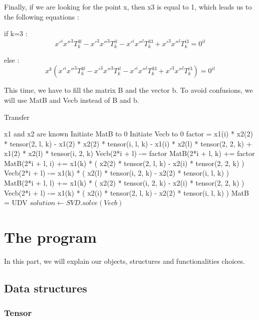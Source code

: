 \documentclass[a4paper,10pt]{report}
\begin{document}
Finally, if we are looking for the point x, then x3 is equal to 1, which leads us to the following equations :

if k=3 :
\[x'^{i}x''^{3}T^{3l}_{k} - x'^{3}x''^{3}T^{il}_{k} - x'^{i}x''^{l}T^{33}_{k} + x'^{3}x''^{l}T^{i3}_{k} = 0^{il}\]

else :
\[x^{k}(x'^{i}x''^{3}T^{3l}_{k} - x'^{3}x''^{3}T^{il}_{k} - x'^{i}x''^{l}T^{33}_{k} + x'^{3}x''^{l}T^{i3}_{k}) = 0^{il}\]

This time, we have to fill the matrix B and the vector b. To avoid confusions, we will use MatB and Vecb instead of B and b.

\begin{algorithm}
\caption{Transfer}
\begin{algorithmic}
\REQUIRE x1 and x2 are known
\STATE Initiate MatB to 0
\STATE Initiate Vecb to 0
\STATE factor = x1(i) * x2(2) * tensor(2, l, k) - x1(2) * x2(2) * tensor(i, l, k) - x1(i) * x2(l) * tensor(2, 2, k) + x1(2) * x2(l) * tensor(i, 2, k)
\STATE Vecb(2*i + l) -= factor
\ELSE
\STATE MatB(2*i + l, k) += factor
\ENDIF
{}
\STATE MatB(2*i + l, i) += x1(k) * ( x2(2) * tensor(2, l, k) - x2(i) * tensor(2, 2, k) )
\STATE Vecb(2*i + l) -= x1(k) * ( x2(l) * tensor(i, 2, k) - x2(2) * tensor(i, l, k) )
\STATE MatB(2*i + l, l) += x1(k) * ( x2(2) * tensor(i, 2, k) - x2(i) * tensor(2, 2, k) )
\STATE Vecb(2*i + l) -= x1(k) * ( x2(i) * tensor(2, l, k) - x2(2) * tensor(i, l, k) )
\ENDIF
\ENDFOR
\ENDFOR
\ENDFOR
\STATE MatB = UDV 
\STATE $solution \leftarrow SVD.solve(Vecb)$
\end{algorithmic}
\end{algorithm}


\chapter{The program}

In this part, we will explain our objects, structures and functionalities choices.
\\

\section{Data structures}
\subsection{Tensor}
\end{document}
